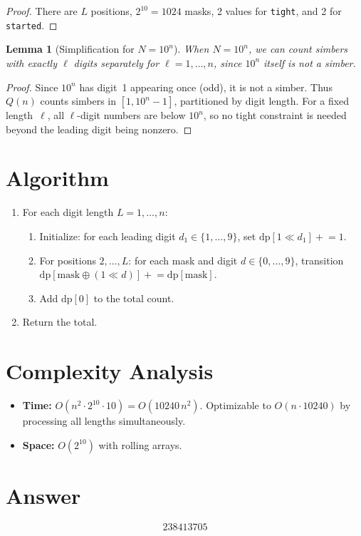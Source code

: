 \documentclass[11pt]{article}
\newtheorem{lemma}[theorem]{Lemma}
\begin{document}
\begin{proof}
There are $L$ positions, $2^{10} = 1024$ masks, 2 values for \texttt{tight}, and 2 for \texttt{started}.
\end{proof}

\begin{lemma}[Simplification for $N = 10^n$]
When $N = 10^n$, we can count simbers with exactly $\ell$ digits separately for $\ell = 1, \ldots, n$, since $10^n$ itself is not a simber.
\end{lemma}

\begin{proof}
Since $10^n$ has digit~1 appearing once (odd), it is not a simber. Thus $Q(n)$ counts simbers in $[1, 10^n - 1]$, partitioned by digit length. For a fixed length~$\ell$, all $\ell$-digit numbers are below $10^n$, so no tight constraint is needed beyond the leading digit being nonzero.
\end{proof}

\section{Algorithm}

\begin{enumerate}
    \item For each digit length $L = 1, \ldots, n$:
    \begin{enumerate}
        \item Initialize: for each leading digit $d_1 \in \{1, \ldots, 9\}$, set $\mathrm{dp}[1 \ll d_1] \mathrel{+}= 1$.
        \item For positions $2, \ldots, L$: for each mask and digit $d \in \{0, \ldots, 9\}$, transition $\mathrm{dp}[\mathrm{mask} \oplus (1 \ll d)] \mathrel{+}= \mathrm{dp}[\mathrm{mask}]$.
        \item Add $\mathrm{dp}[0]$ to the total count.
    \end{enumerate}
    \item Return the total.
\end{enumerate}

\section{Complexity Analysis}

\begin{itemize}
    \item \textbf{Time:} $O(n^2 \cdot 2^{10} \cdot 10) = O(10240\,n^2)$. Optimizable to $O(n \cdot 10240)$ by processing all lengths simultaneously.
    \item \textbf{Space:} $O(2^{10})$ with rolling arrays.
\end{itemize}

\section{Answer}

\[
\boxed{238413705}
\]
\end{document}
